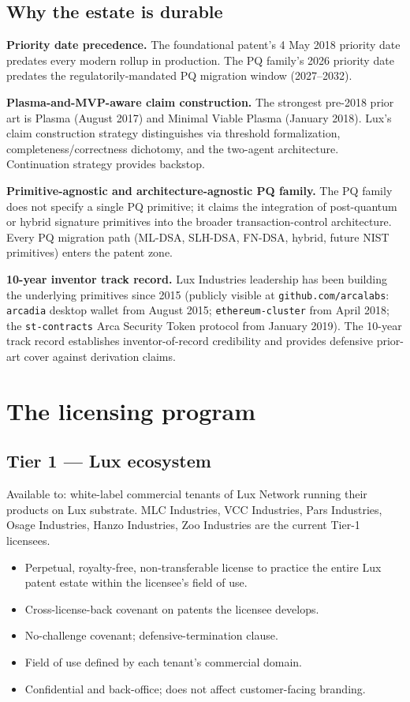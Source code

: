 \documentclass[11pt,letterpaper]{article}
\begin{document}
\subsection{Why the estate is durable}

\textbf{Priority date precedence.} The foundational patent's 4 May 2018 priority date predates every modern rollup in production. The PQ family's 2026 priority date predates the regulatorily-mandated PQ migration window (2027--2032).

\textbf{Plasma-and-MVP-aware claim construction.} The strongest pre-2018 prior art is Plasma (August 2017) and Minimal Viable Plasma (January 2018). Lux's claim construction strategy distinguishes via threshold formalization, completeness/correctness dichotomy, and the two-agent architecture. Continuation strategy provides backstop.

\textbf{Primitive-agnostic and architecture-agnostic PQ family.} The PQ family does not specify a single PQ primitive; it claims the integration of post-quantum or hybrid signature primitives into the broader transaction-control architecture. Every PQ migration path (ML-DSA, SLH-DSA, FN-DSA, hybrid, future NIST primitives) enters the patent zone.

\textbf{10-year inventor track record.} Lux Industries leadership has been building the underlying primitives since 2015 (publicly visible at \texttt{github.com/arcalabs}: \texttt{arcadia} desktop wallet from August 2015; \texttt{ethereum-cluster} from April 2018; the \texttt{st-contracts} Arca Security Token protocol from January 2019). The 10-year track record establishes inventor-of-record credibility and provides defensive prior-art cover against derivation claims.

\section{The licensing program}

\subsection{Tier 1 --- Lux ecosystem}

Available to: white-label commercial tenants of Lux Network running their products on Lux substrate. MLC Industries, VCC Industries, Pars Industries, Osage Industries, Hanzo Industries, Zoo Industries are the current Tier-1 licensees.

\begin{itemize}
\item Perpetual, royalty-free, non-transferable license to practice the entire Lux patent estate within the licensee's field of use.
\item Cross-license-back covenant on patents the licensee develops.
\item No-challenge covenant; defensive-termination clause.
\item Field of use defined by each tenant's commercial domain.
\item Confidential and back-office; does not affect customer-facing branding.
\end{itemize}
\end{document}
